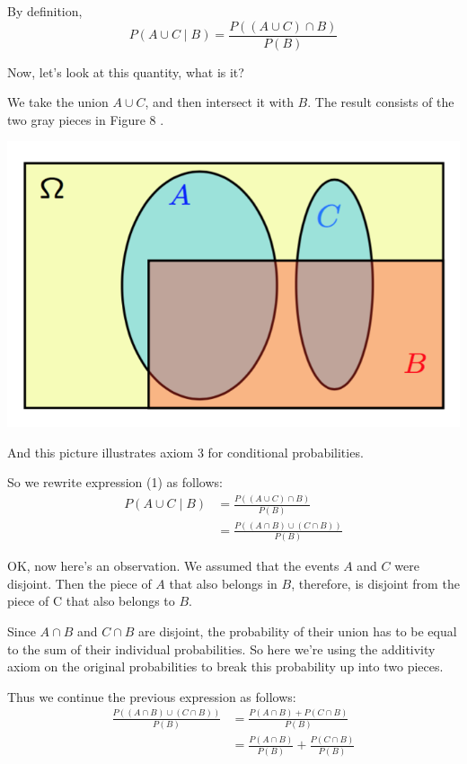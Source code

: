 \documentclass{tufte-handout}
\begin{document}
By definition,
\begin{equation}
 P( A \cup C \mid B) = \frac{P \left( (A \cup C ) \cap B \right)}{P(B)}
\end{equation}

Now, let's look at this quantity, what is it?

We take the union $A \cup C$, and then intersect it with $B$. The result consists 
of the two gray pieces in Figure 8 .

\begin{marginfigure}
  \includegraphics{CondProbAx3}
  \caption{And this picture illustrates axiom 3 for conditional probabilities.}
\end{marginfigure}

So we rewrite expression (1) as follows:
\begin{align*}
 P( A \cup C \mid B) &= \frac{P \left( (A \cup C ) \cap B \right)}{P(B)} \\
 &= \frac{P \left( (A \cap B) \cup (C \cap B) \right)}{P(B)}
\end{align*}

OK, now here's an observation. We assumed that the events $A$ and $C$ were disjoint. Then the piece
of $A$ that also belongs in $B$, therefore, is disjoint from the piece of C that also belongs to $B$.

Since $A \cap B$ and $C \cap B$ are disjoint, the probability of their
union has to be equal to the sum of their individual probabilities. So here we're using the additivity
axiom on the original probabilities to break this probability up into two pieces. 

Thus we continue the previous expression as follows:
\begin{align*}
\frac{P \left( (A \cap B) \cup (C \cap B) \right)}{P(B)} &= \frac{P (A \cap B)  + P (C \cap B)}{P(B)}\\
 &= \frac{P (A \cap B)}{P(B)}  + \frac{P (C \cap B)}{P(B)}
\end{align*}
\end{document}
